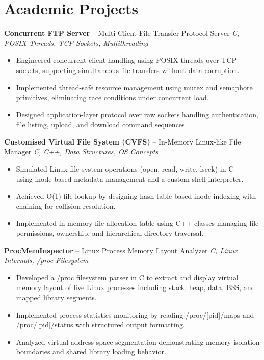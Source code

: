 \documentclass[10.5pt,a4paper]{article}
\begin{document}
\section{Academic Projects}
\textbf{Concurrent FTP Server} -- Multi-Client File Transfer Protocol Server \hfill \textit{C, POSIX Threads, TCP Sockets, Multithreading}
\begin{itemize}
  \item Engineered concurrent client handling using POSIX threads over TCP sockets, supporting simultaneous file transfers without data corruption.
  \item Implemented thread-safe resource management using mutex and semaphore primitives, eliminating race conditions under concurrent load.
  \item Designed application-layer protocol over raw sockets handling authentication, file listing, upload, and download command sequences.
\end{itemize}
\vspace{2pt}
\textbf{Customised Virtual File System (CVFS)} -- In-Memory Linux-like File Manager \hfill \textit{C, C++, Data Structures, OS Concepts}
\begin{itemize}
  \item Simulated Linux file system operations (open, read, write, lseek) in C++ using inode-based metadata management and a custom shell interpreter.
  \item Achieved O(1) file lookup by designing hash table-based inode indexing with chaining for collision resolution.
  \item Implemented in-memory file allocation table using C++ classes managing file permissions, ownership, and hierarchical directory traversal.
\end{itemize}
\vspace{2pt}
\textbf{ProcMemInspector} -- Linux Process Memory Layout Analyzer \hfill \textit{C, Linux Internals, /proc Filesystem}
\begin{itemize}
  \item Developed a /proc filesystem parser in C to extract and display virtual memory layout of live Linux processes including stack, heap, data, BSS, and mapped library segments.
  \item Implemented process statistics monitoring by reading /proc/[pid]/maps and /proc/[pid]/status with structured output formatting.
  \item Analyzed virtual address space segmentation demonstrating memory isolation boundaries and shared library loading behavior.
\end{itemize}
\end{document}
